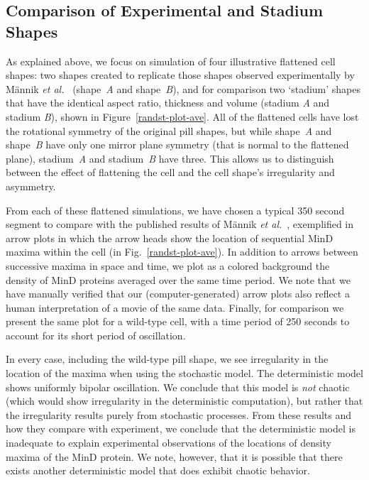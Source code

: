 \documentclass[10pt,letterpaper]{article}
\begin{document}
\subsection*{Comparison of Experimental and Stadium Shapes}
As explained above, we focus on simulation of four illustrative
flattened cell shapes: two shapes created to replicate those shapes
observed experimentally by M\"annik \emph{et
  al.}~\cite{mannik2012robustness} (shape~\emph{A} and
shape~\emph{B}), and for comparison two `stadium' shapes that have the
identical aspect ratio, thickness and volume (stadium \emph{A} and
stadium \emph{B}), shown in Figure~\ref{randst-plot-ave}.  All of the
flattened cells have lost the rotational symmetry of the original pill
shapes, but while shape~\emph{A} and shape~\emph{B} have only one
mirror plane symmetry (that is normal to the flattened plane),
stadium~\emph{A} and stadium~\emph{B} have three.  This allows us to
distinguish between the effect of flattening the cell and the cell
shape's irregularity and asymmetry.


From each of these flattened simulations, we have chosen a typical 350
second segment to compare with the published results of
M\"annik \emph{et al.}~\cite{mannik2012robustness}, exemplified in arrow plots in
which the arrow heads show the location of sequential MinD maxima
within the cell (in Fig.~\ref{randst-plot-ave}).  In addition to
arrows between successive maxima in space and time, we plot as a
colored background the density of MinD proteins averaged over the same
time period.  We note that we have manually verified that our
(computer-generated) arrow plots also reflect a human interpretation
of a movie of the same data.  Finally, for comparison we present the
same plot for a wild-type cell, with a time period of 250 seconds to
account for its short period of oscillation.

In every case, including the wild-type pill shape, we see irregularity
in the location of the maxima when using the stochastic model.  The
deterministic model shows uniformly bipolar oscillation.  We conclude
that this model is \emph{not} chaotic (which would show irregularity
in the deterministic computation), but rather that the irregularity
results purely from stochastic processes.  From these results and how
they compare with experiment, we conclude that the deterministic model
is inadequate to explain experimental observations of the locations of
density maxima of the MinD protein.  We note, however, that it is
possible that there exists another deterministic model that does exhibit
chaotic behavior.
\end{document}
